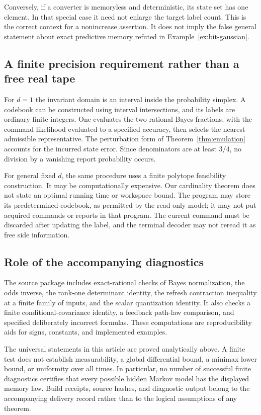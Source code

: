 Conversely, if a converter is memoryless and deterministic, its state set
has one element. In that special case it need not enlarge the target
label count. This is the correct context for a nonincrease assertion.
It does not imply the false general statement about exact predictive
memory refuted in Example~\ref{ex:bit-gaussian}.

\subsection{A finite precision requirement rather than a free real tape}
For $d=1$ the invariant domain is an interval inside the probability
simplex. A codebook can be constructed using interval intersections, and
its labels are ordinary finite integers. One evaluates the two rational
Bayes fractions, with the command likelihood evaluated to a specified
accuracy, then selects the nearest admissible representative. The
perturbation form of Theorem~\ref{thm:emulation} accounts for the incurred
state error. Since denominators are at least $3/4$, no division by a
vanishing report probability occurs.

For general fixed $d$, the same procedure uses a finite polytope
feasibility construction. It may be computationally expensive. Our
cardinality theorem does not state an optimal running time or workspace
bound. The program may store its predetermined codebook, as permitted by
the read-only model; it may not put acquired commands or reports in that
program. The current command must be discarded after updating the label,
and the terminal decoder may not reread it as free side information.

\subsection{Role of the accompanying diagnostics}
The source package includes exact-rational checks of Bayes normalization,
the odds inverse, the rank-one determinant identity, the refresh
contraction inequality at a finite family of inputs, and the scalar
quantization identity. It also checks a finite conditional-covariance
identity, a feedback path-law comparison, and specified deliberately
incorrect formulas. These computations are reproducibility aids for
signs, constants, and implemented examples.

The universal statements in this article are proved analytically above.
A finite test does not establish measurability, a global differential
bound, a minimax lower bound, or uniformity over all times. In particular,
no number of successful finite diagnostics certifies that every possible
hidden Markov model has the displayed memory law. Build receipts,
source hashes, and diagnostic output belong to the accompanying delivery
record rather than to the logical assumptions of any theorem.
